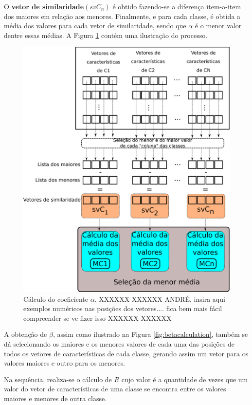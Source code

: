 				\par O \textbf{vetor de similaridade}$(svC_n)$ é obtido fazendo-se a diferença item-a-item dos maiores em relação aos menores. Finalmente, e para cada classe, é obtida a média dos valores para cada vetor de similaridade, sendo que $\alpha$ é o menor valor dentre essas médias. A Figura \ref{fig:calculoalpha} contém uma ilustração do processo.
				
				\begin{figure}
					\centering
		       	\includegraphics[width=0.7\linewidth]{images/calculoAlpha.pdf}
					\caption{Cálculo do coeficiente $\alpha$. XXXXXX XXXXXX ANDRÉ, insira aqui exemplos numéricos nas posições dos vetores.... fica bem mais fácil compreender se vc fizer isso XXXXXX XXXXXX}
					\label{fig:calculoalpha}
				\end{figure}
				
				\par A obtenção de $\beta$, assim como ilustrado na Figura \ref{fig:betacalculation}, também se dá selecionando os maiores e os menores valores de cada uma das posições de todos os vetores de características de cada classe, gerando assim um vetor para os valores maiores e outro para os menores.
				
				\par Na sequência, realiza-se o cálculo de $R$ cujo valor é a quantidade de vezes que um valor do vetor de características de uma classe se encontra entre os valores maiores e menores de outra classe.
				

